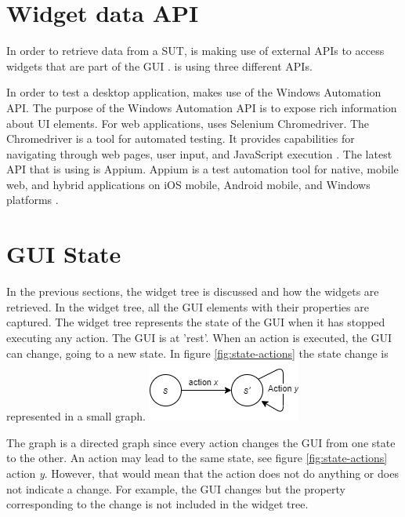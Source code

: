 \section{Widget data API}

In order to retrieve data from a SUT, \testar is making use of external APIs to access widgets that are part of the GUI \cite{thesisMulders}. \testar is using three different APIs.

In order to test a desktop application, \testar makes use of the Windows Automation API. The purpose of the Windows Automation API is to expose rich information about UI elements\cite{win-api-info}. For web applications, \testar uses Selenium Chromedriver. The Chromedriver is a tool for automated testing. It provides capabilities for navigating through web pages, user input, and JavaScript execution \cite{chrome-driver-info}. The latest API that \testar is using is Appium. Appium is a test automation tool for native, mobile web, and hybrid applications on iOS mobile, Android mobile, and Windows platforms \cite{appium-info}.

\section{GUI State} \label{gui-state}
In the previous sections, the widget tree is discussed and how the widgets are retrieved. In the widget tree, all the GUI elements with their properties are captured. The widget tree represents the state of the GUI when it has stopped executing any action. The GUI is at 'rest'. When an action is executed, the GUI can change, going to a new state. In figure \ref{fig:state-actions} the state change is represented in a small graph. 
\bigskip
\begingroup
\captionsetup{type=figure}
\includegraphics{images/state-action.png}
\label{fig:state-actions}
\endgroup

The graph is a directed graph since every action changes the GUI from one state to the other. An action may lead to the same state, see figure \ref{fig:state-actions} action \textit{y}. However, that would mean that the action does not do anything or \testar does not indicate a change. For example, the GUI changes but the property corresponding to the change is not included in the widget tree.


